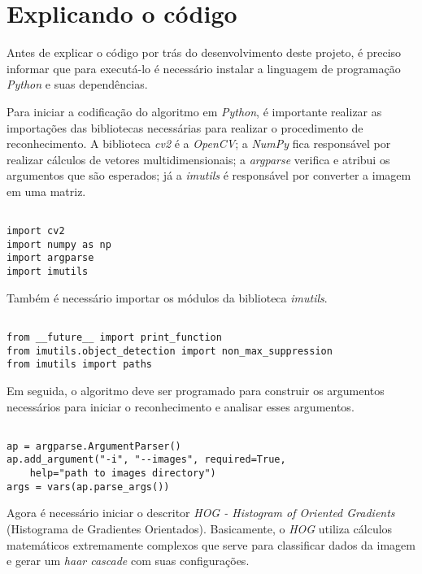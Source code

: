 \section{\textbf{Explicando o código}}
\label{explicacao-codigo}

Antes de explicar o código por trás do desenvolvimento deste projeto, é preciso informar que para executá-lo é necessário instalar a linguagem de programação \textit{Python} e suas dependências.

Para iniciar a codificação do algoritmo em \textit{Python}, é importante realizar as importações das bibliotecas necessárias para realizar o procedimento de reconhecimento. A biblioteca \textit{cv2} é a \textit{OpenCV}; a \textit{NumPy} fica responsável por realizar cálculos de vetores multidimensionais; a \textit{argparse} verifica e atribui os argumentos que são esperados; já a \textit{imutils} é responsável por converter a imagem em uma matriz.

\begin{verbatim}

import cv2
import numpy as np
import argparse
import imutils

\end{verbatim}

Também é necessário importar os módulos da biblioteca \textit{imutils}.

\begin{verbatim}

from __future__ import print_function
from imutils.object_detection import non_max_suppression
from imutils import paths

\end{verbatim}

Em seguida, o algoritmo deve ser programado para construir os argumentos necessários para iniciar o reconhecimento e analisar esses argumentos.

\begin{verbatim}

ap = argparse.ArgumentParser()
ap.add_argument("-i", "--images", required=True,
    help="path to images directory")
args = vars(ap.parse_args())

\end{verbatim}

Agora é necessário iniciar o descritor \textit{HOG - Histogram of Oriented Gradients} (Histograma de Gradientes Orientados). Basicamente, o \textit{HOG} utiliza cálculos matemáticos extremamente complexos que serve para classificar dados da imagem e gerar um \textit{haar cascade} com suas configurações.

